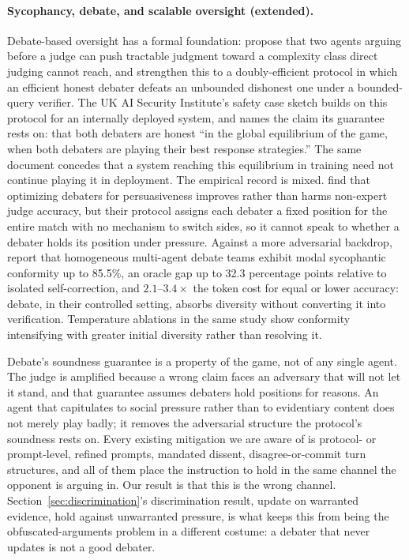 \paragraph{Sycophancy, debate, and scalable oversight (extended).} Debate-based
oversight has a formal foundation: \citet{irving2018debate} propose that two agents
arguing before a judge can push tractable judgment toward a complexity class direct
judging cannot reach, and \citet{browncohen2023doublyefficient} strengthen this to a
doubly-efficient protocol in which an efficient honest debater defeats an unbounded
dishonest one under a bounded-query verifier. The UK AI Security Institute's safety
case sketch \citep{buhl2025aisi} builds on this protocol for an internally deployed
system, and names the claim its guarantee rests on: that both debaters are honest ``in
the global equilibrium of the game, when both debaters are playing their best response
strategies.'' The same document concedes that a system reaching this equilibrium in
training need not continue playing it in deployment. The empirical record is mixed.
\citet{khan2024persuasive} find that optimizing debaters for persuasiveness improves
rather than harms non-expert judge accuracy, but their protocol assigns each debater a
fixed position for the entire match with no mechanism to switch sides, so it cannot
speak to whether a debater holds its position under pressure. Against a more
adversarial backdrop, \citet{bertalanic2026costofconsensus} report that homogeneous
multi-agent debate teams exhibit modal sycophantic conformity up to 85.5\%, an oracle
gap up to 32.3 percentage points relative to isolated self-correction, and
$2.1$--$3.4\times$ the token cost for equal or lower accuracy: debate, in their
controlled setting, absorbs diversity without converting it into verification.
Temperature ablations in the same study show conformity intensifying with greater
initial diversity rather than resolving it.

Debate's soundness guarantee is a property of the game, not of any single agent. The
judge is amplified because a wrong claim faces an adversary that will not let it stand,
and that guarantee assumes debaters hold positions for reasons. An agent that
capitulates to social pressure rather than to evidentiary content does not merely play
badly; it removes the adversarial structure the protocol's soundness rests on. Every
existing mitigation we are aware of is protocol- or prompt-level, refined prompts,
mandated dissent, disagree-or-commit turn structures, and all of them place the
instruction to hold in the same channel the opponent is arguing in. Our result is that
this is the wrong channel. Section~\ref{sec:discrimination}'s discrimination result,
update on warranted evidence, hold against unwarranted pressure, is what keeps this
from being the obfuscated-arguments problem \citep{barnes2020obfuscated} in a different
costume: a debater that never updates is not a good debater.

